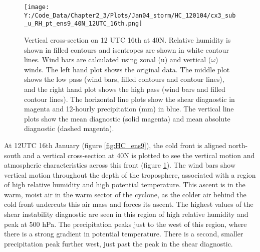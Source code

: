 
\begin{figure}[h]	
	\texttt{[image: Y:/Code\_Data/Chapter2\_3/Plots/Jan04\_storm/HC\_120104/cx3\_sub\_u\_RH\_pt\_ens9\_40N\_12UTC\_16th.png]}
	\caption{Vertical cross-section on 12 UTC 16th at 40N. Relative humidity is shown in filled contours and isentropes are shown in white contour lines. Wind bars are calculated using zonal (u) and vertical ($\omega$) winds. The left hand plot shows the original data. The middle plot shows the low pass (wind bars, filled contours and contour lines), and the right hand plot shows the high pass (wind bars and filled contour lines). The horizontal line plots show the shear diagnostic in magenta and 12-hourly precipitation (mm) in blue. The vertical line plots show the mean diagnostic (solid magenta) and mean absolute diagnostic (dashed magenta).}\label{fig:HC_cxA}
	\centering
\end{figure}

At 12UTC 16th January (figure \ref{fig:HC_ens9}), the cold front is aligned north-south and a vertical cross-section at 40N is plotted to see the vertical motion and atmospheric characteristics across this front (figure \ref{fig:HC_cxA}). The wind bars show vertical motion throughout the depth of the troposphere, associated with a region of high relative humidity and high potential temperature. This ascent is in the warm, moist air in the warm sector of the cyclone, as the colder air behind the cold front undercuts this air mass and forces its ascent. The highest values of the shear instability diagnostic are seen in this region of high relative humidity and peak at 500 hPa. The precipitation peaks just to the west of this region, where there is a strong gradient in potential temperature. There is a second, smaller precipitation peak further west, just past the peak in the shear diagnostic.



